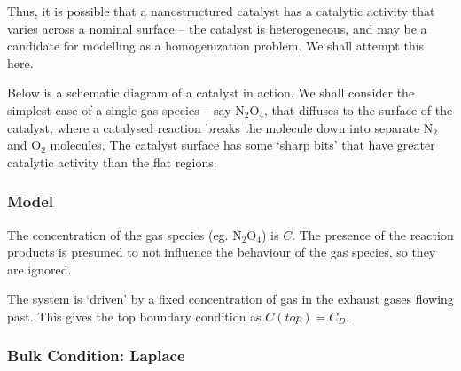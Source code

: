 \documentclass[a4paper]{report}
\begin{document}
Thus, it is possible that a nanostructured catalyst has a catalytic activity that varies across a nominal surface  -- the catalyst is heterogeneous, and may be a candidate for modelling as a homogenization problem.  We shall attempt this here.

\vspace*{1em}
Below is a schematic diagram of a catalyst in action.  We shall consider the simplest case of a single gas species -- say N$_2$O$_4$, that diffuses to the surface of the catalyst, where a catalysed reaction breaks the molecule down into separate N$_2$ and O$_2$ molecules.  The catalyst surface has some `sharp bits' that have greater catalytic activity than the flat regions.



\begin{center}
\end{center}

\subsubsection*{Model}

The concentration of the gas species (eg. N$_2$O$_4$) is $C$.  The presence of the reaction products is presumed to not influence the behaviour of the gas species, so they are ignored.
\vspace*{1em}

The system is `driven' by a fixed concentration of gas in the exhaust gases flowing past.  This gives the top boundary condition as $C(top) = C_D$.


\subsubsection*{Bulk Condition: Laplace}
\end{document}
